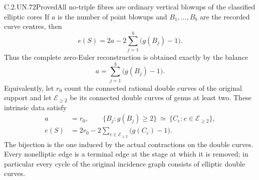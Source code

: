 \begin{statement}{C.2.UN.72}{Proved}{All no-triple fibres are ordinary vertical blowups of the classified elliptic cores}
If $a$ is the number of point blowups and $B_1,\ldots,B_b$
are the recorded curve centres, then
\[
                 e(S)=2a-2\sum_{j=1}^b\bigl(g(B_j)-1\bigr).
\tag{C.NT.2}
\]
Thus the complete zero-Euler reconstruction is obtained
exactly by the balance
\[
                       a=\sum_{j=1}^b\bigl(g(B_j)-1\bigr).
\tag{C.NT.3}
\]
Equivalently, let $r_0$ count the connected rational
double curves of the original support and let
$\mathcal E_{\ge2}$ be its connected double curves of
genus at least two. These intrinsic data satisfy
\[
 \begin{split}
 a&=r_0,\qquad
 \{B_j:g(B_j)\ge2\}
       \ \simeq\ \{C_e:e\in\mathcal E_{\ge2}\},\\
 e(S)&=2r_0-2\sum_{e\in\mathcal E_{\ge2}}
                                      \bigl(g(C_e)-1\bigr).
 \end{split}
\tag{C.NT.4}
\]
The bijection is the one induced by the actual contractions
on the double curves. Every nonelliptic edge is a terminal
edge at the stage at which it is removed; in particular
every cycle of the original incidence graph consists of
elliptic double curves.
\end{statement}

